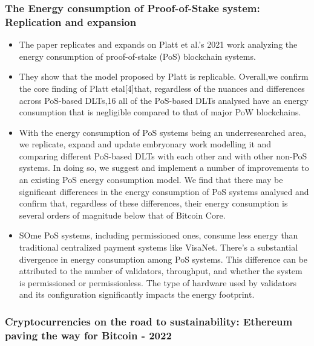 \documentclass{article}
\begin{document}
\subsubsection{The Energy consumption of Proof-of-Stake system: Replication and expansion}\cite{ibanezEnergyConsumptionProofofStake2023}
\begin{itemize}
    \item The paper replicates and expands on Platt et al.'s 2021 work analyzing the energy consumption of proof-of-stake (PoS) blockchain systems.
    \item They show that the model proposed by Platt is replicable. Overall,we confirm the core finding of Platt etal[4]that, regardless of the nuances and differences across PoS-based DLTs,16 all of the PoS-based DLTs analysed have an energy consumption that is negligible compared to that of major PoW blockchains.
    \item With the energy consumption of PoS systems being an underresearched area, we replicate, expand and update embryonary work modelling it and comparing different PoS-based DLTs with
          each other and with other non-PoS systems. In doing so, we suggest and implement a number of improvements to an existing PoS energy consumption model. We find that there may be significant differences in the energy consumption of PoS systems analysed and confirm that, regardless of these differences, their energy
          consumption is several orders of magnitude below that of Bitcoin Core.
    \item SOme PoS systems, including permissioned ones, consume less energy than traditional centralized payment systems like VisaNet.
          There's a substantial divergence in energy consumption among PoS systems. This difference can be attributed to the number of validators, throughput, and whether the system is permissioned or permissionless.
          The type of hardware used by validators and its configuration significantly impacts the energy footprint.

\end{itemize}



\subsubsection{Cryptocurrencies on the road to sustainability: Ethereum paving the way for Bitcoin - 2022} \cite{devriesCryptocurrenciesRoadSustainability2022}
\end{document}
